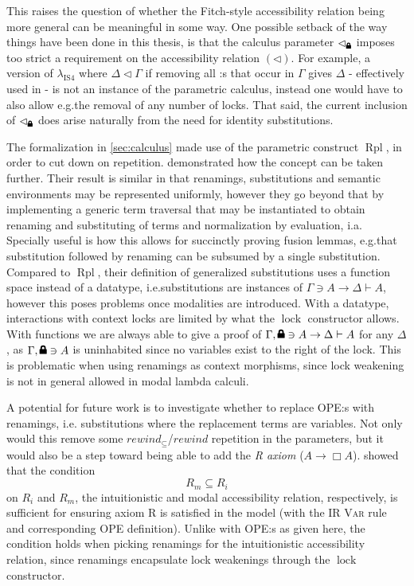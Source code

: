 \documentclass[12pt,twoside,openright]{report}
\numberwithin{equation}{chapter}
\numberwithin{figure}{chapter}
\numberwithin{table}{chapter}
\theoremstyle{definition}\newtheorem{definition}{Definition}
\newcommand{\lock}{\text{\tikz[baseline]{
      \fill[rounded corners=.1ex] (-.75ex,0) rectangle (.75ex,1ex);
      \draw[line width=.3ex] (-.4ex,.5ex) -- ++(0,.75ex) arc (180:0:.4ex) -- ++(0,-.75ex);
}}}
\begin{document}
This raises the question of whether the Fitch-style accessibility relation being more general
can be meaningful in some way.
One possible setback of the way things have been done in this thesis,
is that the calculus parameter $\lhd_\lock$ imposes too strict a requirement
on the accessibility relation $(\lhd)$.
For example, a version of $\lambda_\text{IS4}$
where $\Delta \lhd \Gamma$ if removing all \lock:s that occur in $\Gamma$ gives $\Delta$ -
effectively used in \cite{gratzer19} -
is not an instance of the parametric calculus,
instead one would have to also allow e.g.\@ the removal of any number of locks.
That said, the current inclusion of $\lhd_\lock$ does arise naturally
from the need for identity substitutions.

The formalization in \autoref{sec:calculus} made use of the parametric construct $\operatorname{Rpl}$,
in order to cut down on repetition.
\textcite{allais17} demonstrated how the concept can be taken further.
Their result is similar in that renamings, substitutions and semantic environments
may be represented uniformly,
however they go beyond that by implementing a generic term traversal
that may be instantiated to obtain
renaming and substituting of terms and normalization by evaluation, i.a.
Specially useful is how this allows for succinctly proving fusion lemmas,
e.g.\@ that substitution followed by renaming can be subsumed by a single substitution.
Compared to $\operatorname{Rpl}$,
their definition of generalized substitutions uses a function space instead of a datatype,
i.e.\@ substitutions are instances of $\Gamma \ni A \to \Delta \vdash A$,
however this poses problems once modalities are introduced.
With a datatype, interactions with context locks are limited
by what the $\operatorname{lock}$ constructor allows.
With functions we are always able to give a proof of
$\Gamma, \lock \ni A \to \Delta \vdash A$ for any $\Delta$,
as $\Gamma, \lock \ni A$ is uninhabited
since no variables exist to the right of the lock.
This is problematic when using renamings as context morphisms,
since lock weakening is not in general allowed in modal lambda calculi.

A potential for future work is to investigate whether to replace OPE:s with renamings,
i.e. substitutions where the replacement terms are variables.
Not only would this remove
some $\textit{rewind}_\subseteq$/$\textit{rewind}$ repetition in the parameters,
but it would also be a step toward being able to add the \emph{R axiom}
($A \to \Box A$).
\textcite{valliappan-r} showed that the condition
$$ R_m \subseteq R_i $$
on $R_i$ and $R_m$, the intuitionistic and modal accessibility relation, respectively,
is sufficient for ensuring axiom R is satisfied in the model
(with the IR \textsc{Var} rule and corresponding OPE definition).
Unlike with OPE:s as given here,
the condition holds when picking renamings for the intuitionistic accessibility relation,
since renamings encapsulate lock weakenings through the $\operatorname{lock}$ constructor.
\end{document}
